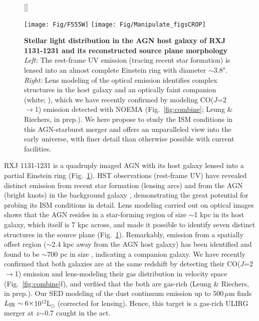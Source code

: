 \documentclass[12pt,a4paper]{article}
\newcommand{\Lsun}{\mbox{L$_{\odot}$}\xspace}
\newcommand{\rarr}{$\rightarrow$}
\newcommand{\bco}{\mbox{CO($J$=2\rarr1)}\xspace}
\newcommand{\rot}[3][HCN]{\mbox{#1($J$=#2\rarr#3)}\xspace}
\newcommand{\Fig}[1]{Fig.~\ref{fig:#1}}
\begin{document}
\begin{figure}[!tbhp]
\centering
\hspace{-0.85em}
[\FBwidth]
{
\vspace*{-0.55em}
\hspace{-0.435em}
\raggedleft
\caption{ \fontsize{10pt}{12pt}\selectfont 
{
\textbf{Stellar light distribution in the AGN host galaxy of RXJ 1131-1231 and its reconstructed source plane
morphology}
{\em Left:} The rest-frame UV emission (tracing recent star formation) 
is lensed into an almost complete Einstein ring with diameter $\sim$3.8". 
{\em Right:} Lens modeling of the optical emission identifies complex structures in the host galaxy and
an optically faint companion (white; \citealt{Claeskens06a}), 
which we have recently confirmed by modeling \bco emission detected with NOEMA
(\Fig{combine}; Leung \& Riechers, in prep.). 
We here propose to study
the ISM conditions in this AGN-starburst merger and offers an unparalleled
view into the early universe, with finer
detail than otherwise possible with current facilities. 
}
\label{fig:HST}}}
{\hspace{-1em}
\texttt{[image: Fig/F555W]}
\hspace{-1.5em}
\texttt{[image: Fig/Manipulate\_figsCROP]}
\vspace{-1.0em}
\hspace{-0.5em}
}
\end{figure}
\vspace{-0.8em}
RXJ 1131-1231 is a quadruply imaged AGN with its host galaxy lensed 
into a partial Einstein ring (\Fig{HST}). 
HST observations (rest-frame UV) have revealed distinct emission 
from recent star formation (lensing arcs) and from the AGN (bright knots) in the background galaxy \citep{Sluse03a},
demonstrating the great potential for probing its
ISM conditions in detail. Lens modeling carried out on optical images shows
that the AGN resides in a star-forming region of size $\sim$1 kpc
in its host galaxy, which itself is 7 kpc across, %
and made it possible to identify
seven distinct structures in the source plane (\Fig{HST}). Remarkably, emission 
from 
a spatially offset region ($\sim$2.4 kpc away from the AGN host galaxy) has been identified and found 
to be $\sim$700 pc in size \citep{Brewer08a}, indicating a 
companion galaxy. 
We have recently confirmed that both galaxies are at the same redshift by detecting their 
\rot[CO]{2}{1} emission and lens-modeling their gas distribution 
in velocity space (\Fig{combine}f), and verfiied
that the both are gas-rich (Leung \& Riechers, in prep.). 
Our SED modeling of the dust continuum emission up to 500\,$\mu$m finds $L_{\rm IR}\sim6\times$10$^{12}$\Lsun 
(corrected for lensing). Hence, this target is a gas-rich ULIRG merger at $z$$\sim$0.7 caught in the act. 
\end{document}
